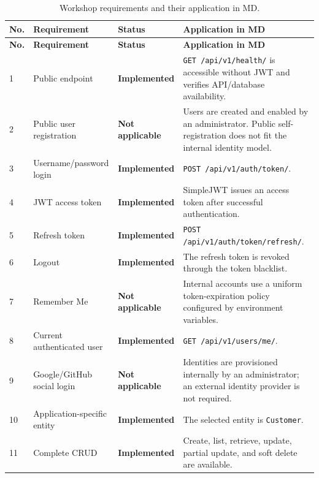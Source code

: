 \documentclass[11pt,a4paper]{article}
\newcommand{\implemented}{
    \textcolor{okgreen}{\textbf{Implemented}}
}
\newcommand{\notapplicable}{
    \textcolor{nogray}{\textbf{Not applicable}}
}
\begin{document}
\small
\begin{longtable}{p{} p{} p{} p{}}
\caption{Workshop requirements and their application in MD.}
\label{tab:reqs}\\
\toprule
\textbf{No.} & \textbf{Requirement} & \textbf{Status} & \textbf{Application in MD} \\
\midrule
\endfirsthead

\toprule
\textbf{No.} & \textbf{Requirement} & \textbf{Status} & \textbf{Application in MD} \\
\midrule
\endhead

1 & Public endpoint & \implemented & \texttt{GET /api/v1/health/} is accessible without JWT and verifies API/database availability. \\

2 & Public user registration & \notapplicable & Users are created and enabled by an administrator. Public self-registration does not fit the internal identity model. \\

3 & Username/password login & \implemented & \texttt{POST /api/v1/auth/token/}. \\

4 & JWT access token & \implemented & SimpleJWT issues an access token after successful authentication. \\

5 & Refresh token & \implemented & \texttt{POST /api/v1/auth/token/refresh/}. \\

6 & Logout & \implemented & The refresh token is revoked through the token blacklist. \\

7 & Remember Me & \notapplicable & Internal accounts use a uniform token-expiration policy configured by environment variables. \\

8 & Current authenticated user & \implemented & \texttt{GET /api/v1/users/me/}. \\

9 & Google/GitHub social login & \notapplicable & Identities are provisioned internally by an administrator; an external identity provider is not required. \\

10 & Application-specific entity & \implemented & The selected entity is \texttt{Customer}. \\

11 & Complete CRUD & \implemented & Create, list, retrieve, update, partial update, and soft delete are available. \\


\end{longtable}
\end{document}
